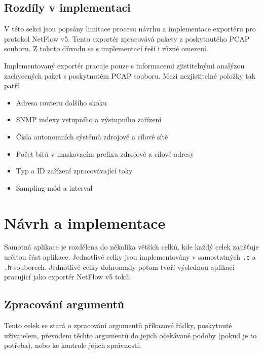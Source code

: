 \documentclass[11pt, a4paper, hidelinks]{article}[08.10.2023]
\begin{document}
    \pagebreak
    \subsection{Rozdíly v implementaci}\label{limitace}
    V této sekci jsou popsány limitace procesu návrhu a implementace exportéru pro protokol NetFlow v5. Tento exportér 
    zpracovává pakety z poskytnutého PCAP souboru. Z tohoto důvodu se s implementací řeší i různé omezení. 
    
    Implementovaný exportér pracuje pouze s informacemi zjistitelnými analýzou zachycených paket s poskytnutém PCAP souboru.
    Mezi nezjistitelné položky tak patří:

    \begin{itemize}
        \item{Adresa routeru dalšího skoku}
        \item{SNMP indexy vstupního a výstupního zařízení}
        \item{Čísla autonomních sýstémů zdrojové a cílové sítě}
        \item{Počet bitů v maskovacím prefixu zdrojové a cílové adresy}
        \item{Typ a ID zařízení zpracovávající toky}
        \item{Sampling mód a interval}
    \end{itemize}

    

    \section{Návrh a implementace}
    Samotná aplikace je rozdělena do několika větších celků, kde každý celek zajišťuje určitou část aplikace. Jednotlivé celky jsou implementovány v 
    samostatných \texttt{.c} a \texttt{.h} souborech. Jednotlivé celky dohromady potom tvoří výslednou aplikaci pracující jako exportér
    NetFlow v5 toků.

    \subsection{Zpracování argumentů}
    Tento celek se stará o zpracování argumentů příkazové řádky, poskytnuté uživatelem, převodem těchto argumentů
    do jejich očekávané podoby (pokud je to potřeba), nebo ke kontrole jejich správnosti.
\end{document}

